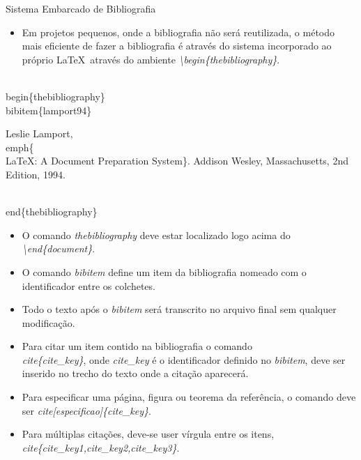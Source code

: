\begin{frame}{Sistema Embarcado de Bibliografia}

  \begin{itemize}
    \item Em projetos pequenos, onde a bibliografia não será reutilizada, o método mais eficiente de fazer a bibliografia
    é através do sistema incorporado ao próprio \LaTeX\ através do ambiente \textit{\textbackslash begin\{thebibliography\}}.    
  \end{itemize}

  \begin{block}{}
  \begin{semiverbatim}
    \\begin\{thebibliography\}
    \\bibitem\{lamport94\}

      Leslie Lamport,
      \\emph\{\\LaTeX: A Document Preparation System\}.
      Addison Wesley, Massachusetts,
      2nd Edition,
      1994.

    \\end\{thebibliography\}
  \end{semiverbatim}
  \end{block}

  \begin{itemize}
    \item O comando \textit{thebibliography} deve estar localizado logo acima do \textit{\textbackslash end\{document\}}.
    \item O comando \textit{bibitem} define um item da bibliografia nomeado com o identificador entre os colchetes.
    \item Todo o texto após o \textit{bibitem} será transcrito no arquivo final sem qualquer modificação.
  \end{itemize}

  \begin{itemize}
   \item Para citar um item contido na bibliografia o comando \textit{\\cite\{cite\_key\}}, onde \textit{cite\_key} é o 
   identificador definido no \textit{bibitem}, deve ser inserido no trecho do texto onde a citação aparecerá.
   \item Para especificar uma página, figura ou teorema da referência, o comando deve ser \textit{cite[especificao]\{cite\_key\}}.
   \item Para múltiplas citações, deve-se user vírgula entre os itens, \textit{cite\{cite\_key1,cite\_key2,cite\_key3\}}.    
  \end{itemize}
 
\end{frame}

